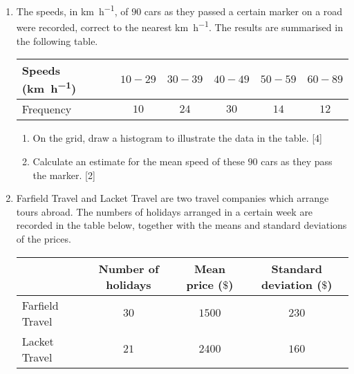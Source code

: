 \begin{enumerate}
\item  The speeds, in \si{\km\per\hour}, of $90$ cars as they passed a certain marker on a road were recorded, correct to the nearest \si{\km\per\hour}. The results are summarised in the following table.


\medskip

\renewcommand{\arraystretch}{1.2} %
\begin{tabular}{|l|c|c|c|c|c|}
	\hline
	Speeds (\si{\km\per\hour})  & $ 10-29 $ & $ 30-39 $ & $ 40-49 $ & $ 50-59$ & $60-89$ \\ 
	\hline
	Frequency & $ 10$ & $ 24 $ & $ 30$ & $ 14$ & $12 $ \\ 
	\hline
\end{tabular}

\medskip

\begin{enumerate}[label=(\roman*)]
	\item On the grid, draw a histogram to illustrate the data in the table. \hfill [4]
	\item Calculate an estimate for the mean speed of these $90$ cars as they pass the marker. \hfill [2]
\end{enumerate}



\item  Farfield Travel and Lacket Travel are two travel companies which arrange tours abroad. The numbers
of holidays arranged in a certain week are recorded in the table below, together with the means and
standard deviations of the prices.

\medskip

\begin{table}[!htpb]
	\centering
	\renewcommand{\arraystretch}{1.2} %
	\begin{tabular}{l|c|c|c|}
		\cline{2-4}
		& Number of holidays & Mean price ($\$$) & Standard deviation ($\$$) \\ \hline
		\multicolumn{1}{|l|}{Farfield Travel} & $30$                 & $1500$            & $230 $                    \\ \hline
		\multicolumn{1}{|l|}{Lacket Travel}   & $21$                 & $2400 $           & $160  $                   \\ \hline
	\end{tabular}
\end{table}


\end{enumerate}
